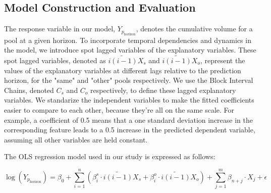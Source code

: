 \documentclass{article}
\begin{document}
\subsection{\textbf{Model Construction and Evaluation}}


The response variable in our model, \(Y_{p_{\text{horizon}}}\), denotes the cumulative volume for a pool at a given horizon. To incorporate temporal dependencies and dynamics in the model, we introduce spot lagged variables of the explanatory variables. These spot lagged variables, denoted as \(\widetilde{i(i-1)}X_s\) and \(\widetilde{i(i-1)}X_o\), represent the values of the explanatory variables at different lags relative to the prediction horizon, for the "same" and "other" pools respectively. We use the Block Interval Chains, denoted \(C_s\) and \(C_o\) respectively, to define these lagged explanatory variables. We standarize the independent variables to make the fitted coefficients easier to compare to each other, because they're all on the same scale. For example, a coefficient of 0.5 means that a one standard deviation increase in the corresponding feature leads to a 0.5 increase in the predicted dependent variable, assuming all other variables are held constant.

The OLS regression model used in our study is expressed as follows:

\begin{equation}
  \log(Y_{p_{\text{horizon}}}) = \beta_0 + \sum_{i=1}^{n} \left(\beta_i^s \cdot \widetilde{i(i-1)}X_s + \beta_i^o \cdot \widetilde{i(i-1)}X_o\right) + \sum_{j=1}^{m} \beta_{n+j} \cdot X_j + \epsilon
  \end{equation}
  
\end{document}
